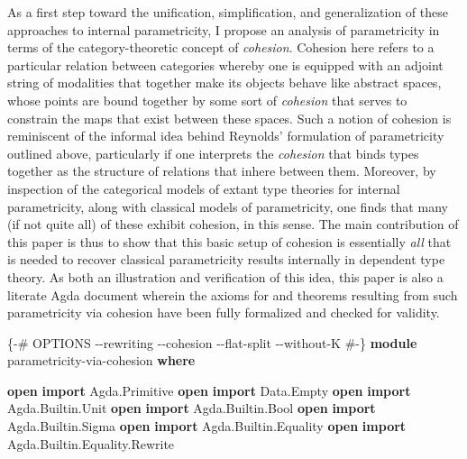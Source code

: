 \documentclass[
  12pt]{article}
\newenvironment{Shaded}{\begin{snugshade}}{\end{snugshade}}
\newcommand{\KeywordTok}[1]{\textcolor[rgb]{0.12,0.11,0.11}{\textbf{#1}}}
\newcommand{\NormalTok}[1]{\textcolor[rgb]{0.12,0.11,0.11}{#1}}
\newcommand{\OtherTok}[1]{\textcolor[rgb]{0.00,0.43,0.16}{#1}}
\newcommand{\PreprocessorTok}[1]{\textcolor[rgb]{0.00,0.43,0.16}{#1}}
\begin{document}
As a first step toward the unification, simplification, and
generalization of these approaches to internal parametricity, I propose
an analysis of parametricity in terms of the category-theoretic concept
of \emph{cohesion}. Cohesion here refers to a particular relation
between categories whereby one is equipped with an adjoint string of
modalities that together make its objects behave like abstract spaces,
whose points are bound together by some sort of \emph{cohesion} that
serves to constrain the maps that exist between these spaces. Such a
notion of cohesion is reminiscent of the informal idea behind Reynolds'
formulation of parametricity outlined above, particularly if one
interprets the \emph{cohesion} that binds types together as the
structure of relations that inhere between them. Moreover, by inspection
of the categorical models of extant type theories for internal
parametricity, along with classical models of parametricity, one finds
that many (if not quite all) of these exhibit cohesion, in this sense.
The main contribution of this paper is thus to show that this basic
setup of cohesion is essentially \emph{all} that is needed to recover
classical parametricity results internally in dependent type theory. As
both an illustration and verification of this idea, this paper is also a
literate Agda document wherein the axioms for and theorems resulting
from such parametricity via cohesion have been fully formalized and
checked for validity.

\begin{Shaded}
\begin{Highlighting}[]
\PreprocessorTok{\{{-}\# OPTIONS {-}{-}rewriting {-}{-}cohesion {-}{-}flat{-}split {-}{-}without{-}K \#{-}\}}
\KeywordTok{module}\NormalTok{ parametricity{-}via{-}cohesion }\KeywordTok{where}
    
\KeywordTok{open} \KeywordTok{import}\NormalTok{ Agda}\OtherTok{.}\NormalTok{Primitive}
\KeywordTok{open} \KeywordTok{import}\NormalTok{ Data}\OtherTok{.}\NormalTok{Empty}
\KeywordTok{open} \KeywordTok{import}\NormalTok{ Agda}\OtherTok{.}\NormalTok{Builtin}\OtherTok{.}\NormalTok{Unit}
\KeywordTok{open} \KeywordTok{import}\NormalTok{ Agda}\OtherTok{.}\NormalTok{Builtin}\OtherTok{.}\NormalTok{Bool}
\KeywordTok{open} \KeywordTok{import}\NormalTok{ Agda}\OtherTok{.}\NormalTok{Builtin}\OtherTok{.}\NormalTok{Sigma}
\KeywordTok{open} \KeywordTok{import}\NormalTok{ Agda}\OtherTok{.}\NormalTok{Builtin}\OtherTok{.}\NormalTok{Equality}
\KeywordTok{open} \KeywordTok{import}\NormalTok{ Agda}\OtherTok{.}\NormalTok{Builtin}\OtherTok{.}\NormalTok{Equality}\OtherTok{.}\NormalTok{Rewrite}
\end{Highlighting}
\end{Shaded}
\end{document}
